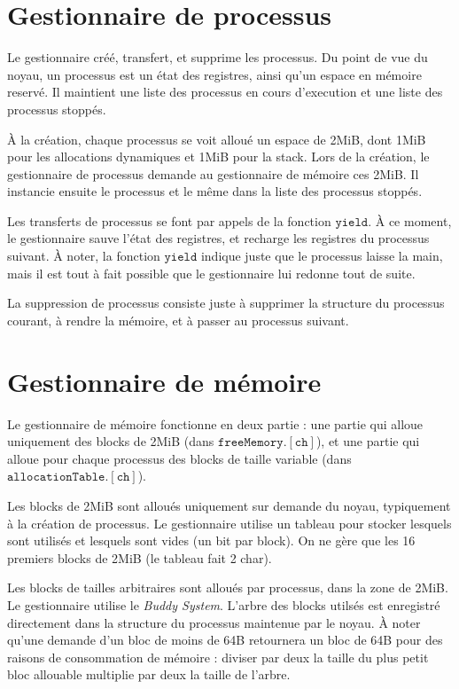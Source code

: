 \documentclass[a4paper,11pt]{article}
\begin{document}
\section{Gestionnaire de processus}
Le gestionnaire créé, transfert, et supprime les processus. Du point de vue du 
noyau, un processus est un état des registres, ainsi qu'un espace en mémoire 
reservé. Il maintient une liste des processus en cours d'execution et une liste 
des processus stoppés.

À la création, chaque processus se voit alloué un espace de 2MiB, dont 1MiB pour
les allocations dynamiques et 1MiB pour la stack. Lors de la création, le 
gestionnaire de processus demande au gestionnaire de mémoire ces 2MiB. Il 
instancie ensuite le processus et le même dans la liste des processus stoppés.

Les transferts de processus se font par appels de la fonction $\mathtt{yield}$.
À ce moment, le gestionnaire sauve l'état des registres, et recharge les 
registres du processus suivant. À noter, la fonction $\mathtt{yield}$ indique 
juste que le processus laisse la main, mais il est tout à fait possible que le
gestionnaire lui redonne tout de suite.

La suppression de processus consiste juste à supprimer la structure du processus
courant, à rendre la mémoire, et à passer au processus suivant.

\section{Gestionnaire de mémoire}
Le gestionnaire de mémoire fonctionne en deux partie : une partie qui alloue 
uniquement des blocks de 2MiB (dans $\mathtt{freeMemory.[ch]}$), et une partie
qui alloue pour chaque processus des blocks de taille variable (dans 
$\mathtt{allocationTable.[ch]}$).

Les blocks de 2MiB sont alloués uniquement sur demande du noyau, typiquement à 
la création de processus. Le gestionnaire utilise un tableau pour stocker 
lesquels sont utilisés et lesquels sont vides (un bit par block). On ne gère que 
les 16 premiers blocks de 2MiB (le tableau fait 2 char).

Les blocks de tailles arbitraires sont alloués par processus, dans la zone de 
2MiB. Le gestionnaire utilise le \emph{Buddy System}. L'arbre des blocks utilsés
est enregistré directement dans la structure du processus maintenue par le 
noyau. À noter qu'une demande d'un bloc de moins de 64B retournera un bloc de 
64B pour des raisons de consommation de mémoire : diviser par deux la taille du 
plus petit bloc allouable multiplie par deux la taille de l'arbre.
\end{document}
